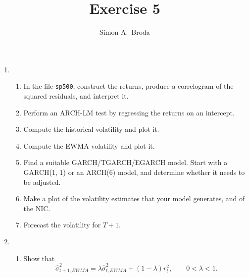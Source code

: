 \documentclass[11pt, a4paper]{article}
\begin{document}
\title{Exercise 5}
\author{Simon A.\ Broda}
\date{}
\maketitle

\begin{enumerate}

\item
\begin{enumerate}
\item In the file \texttt{sp500}, construct the returns, produce a correlogram of the squared residuals, and interpret it.
\item Perform an ARCH-LM test by regressing the returns on an intercept.
\item Compute the historical volatility and plot it.
\item Compute the EWMA volatility and plot it.
\item Find a suitable GARCH/TGARCH/EGARCH model. Start with a GARCH(1, 1) or an ARCH(6) model, and determine whether it needs to be adjusted.
\item Make a plot of the volatility estimates that your model generates, and of the NIC.
\item Forecast the volatility for $T+1$.
\end{enumerate}
\item
\begin{enumerate}
\item Show that
\[
\widehat{\sigma}_{t+1,EWMA}^{2} =\lambda\widehat{\sigma}_{t,EWMA}^{2}+(1-\lambda )r_{t}^{2},\qquad 0<\lambda <1.
\]
\end{enumerate}
\end{enumerate}
\end{document}
